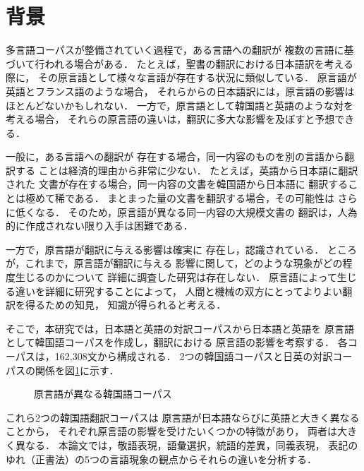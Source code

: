 \maketitle
\thispagestyle{empty}

\section{背景}
\label{sec:background}
多言語コーパスが整備されていく過程で，ある言語への翻訳が
複数の言語に基づいて行われる場合がある．
たとえば，聖書の翻訳における日本語訳を考える際に，
その原言語として様々な言語が存在する状況に類似している．
原言語が英語とフランス語のような場合，
それらからの日本語訳には，原言語の影響はほとんどないかもしれない．
一方で，原言語として韓国語と英語のような対を考える場合，
それらの原言語の違いは，翻訳に多大な影響を及ぼすと予想できる．

一般に，ある言語への翻訳が
存在する場合，同一内容のものを別の言語から翻訳する
ことは経済的理由から非常に少ない．
たとえば，英語から日本語に翻訳された
文書が存在する場合，同一内容の文書を韓国語から日本語に
翻訳することは極めて稀である．
まとまった量の文書を翻訳する場合，その可能性は
さらに低くなる．
そのため，原言語が異なる同一内容の大規模文書の
翻訳は，人為的に作成されない限り入手は困難である．

一方で，原言語が翻訳に与える影響は確実に
存在し，認識されている．
ところが，これまで，原言語が翻訳に与える
影響に関して，どのような現象がどの程度生じるのかについて
詳細に調査した研究は存在しない．
原言語によって生じる違いを詳細に研究することによって，
人間と機械の双方にとってよりよい翻訳を得るための知見，
知識が得られると考える．

そこで，本研究では，日本語と英語の対訳コーパスから日本語と英語を
原言語として韓国語コーパスを作成し，翻訳における
原言語の影響を考察する．
各コーパスは，162,308文から構成される．
2つの韓国語コーパスと日英の対訳コーパスの関係を図\ref{fig_relation}に示す．
\begin{figure}[tb]
 \begin{center}
\caption{原言語が異なる韓国語コーパス}
\label{fig_relation}
 \end{center}
\end{figure}

これら2つの韓国語翻訳コーパスは
原言語が日本語ならびに英語と大きく異なることから，
それぞれ原言語の影響を受けたいくつかの特徴があり，
両者は大きく異なる．
本論文では，敬語表現，語彙選択，統語的差異，同義表現，
表記のゆれ（正書法）の5つの言語現象の観点からそれらの違いを分析する．

